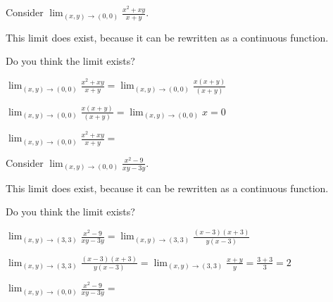 \documentclass{ximera}
\begin{document}
	
	\begin{question}
		Consider $\lim_{(x,y) \to (0,0)} \frac{x^2+xy}{x+y}$.
		\begin{solution}
			\begin{hint}
				This limit does exist, because it can be rewritten as a continuous function.
			\end{hint}
			Do you think the limit exists?
				\begin{multiple-choice}
				\end{multiple-choice}
		\end{solution}
		
		\begin{solution}
			\begin{hint}
				$\lim_{(x,y) \to (0,0)} \frac{x^2+xy}{x+y} = \lim_{(x,y) \to (0,0)} \frac{x(x+y)}{(x+y)}$
			\end{hint}
			\begin{hint}
				$\lim_{(x,y) \to (0,0)} \frac{x(x+y)}{(x+y)} = \lim_{(x,y) \to (0,0)} x = 0$
			\end{hint}
			$\lim_{(x,y) \to (0,0)} \frac{x^2+xy}{x+y} = $\answer{$0$}
		\end{solution}		
		
	\end{question}
	
	\begin{question}
		Consider $\lim_{(x,y) \to (0,0)} \frac{x^2-9}{xy-3y}$.
		\begin{solution}
			\begin{hint}
				This limit does exist, because it can be rewritten as a continuous function.
			\end{hint}
			Do you think the limit exists?
				\begin{multiple-choice}
					\choice[correct]{Yes}
					\choice{No}
				\end{multiple-choice}
		\end{solution}
		
		\begin{solution}
			\begin{hint}
				$\lim_{(x,y) \to (3,3)} \frac{x^2-9}{xy-3y} = \lim_{(x,y) \to (3,3)} \frac{(x-3)(x+3)}{y(x-3)}$
			\end{hint}
			\begin{hint}
				$\lim_{(x,y) \to (3,3)} \frac{(x-3)(x+3)}{y(x-3)} = \lim_{(x,y) \to (3,3)} \frac{x+y}{y} = \frac{3+3}{3} = 2$
			\end{hint}
			$\lim_{(x,y) \to (0,0)} \frac{x^2-9}{xy-3y} = $\answer{$2$}
		\end{solution}		
		
	\end{question}
	
\end{document}
